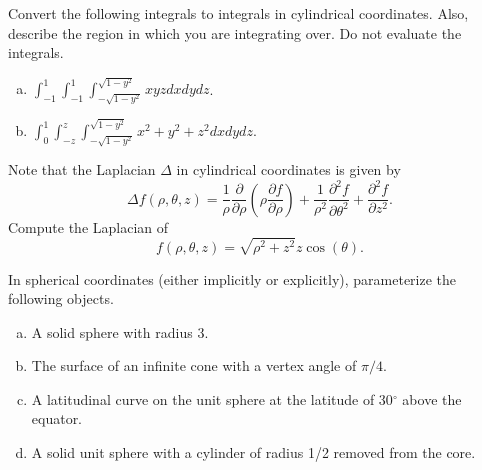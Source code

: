 \documentclass[12pt]{article} %
\begin{document}
\vspace*{.5cm}

\begin{problem}
    Convert the following integrals to integrals in cylindrical coordinates. Also, describe the region in which you are integrating over. Do not evaluate the integrals.
    \begin{enumerate}[(a)]
        \item $\displaystyle{\int_{-1}^{1} \int_{-1}^{1} \int_{-\sqrt{1-y^2}}^{\sqrt{1-y^2}} xyz dxdydz}$.
        \item $\displaystyle{\int_0^1 \int_{-z}^z \int_{-\sqrt{1-y^2}}^{\sqrt{1-y^2}} x^2+y^2+z^2 dxdydz}$.
    \end{enumerate}
\end{problem}

\vspace*{.5cm}

\begin{problem}
    Note that the Laplacian $\Delta$ in cylindrical coordinates is given by
    \[
        \Delta f(\rho,\theta,z) = \frac{1}{\rho} \frac{\partial}{\partial \rho} \left(\rho \frac{\partial f}{\partial \rho}\right)+\frac{1}{\rho^2}\frac{\partial^2 f}{\partial \theta^2} + \frac{\partial^2 f}{\partial z^2}.
    \]
    Compute the Laplacian of
    \[
        f(\rho,\theta,z) = \sqrt{\rho^2+z^2} z \cos(\theta).
    \]
\end{problem}

\begin{problem}
	In spherical coordinates (either implicitly or explicitly), parameterize the following objects.
	\begin{enumerate}[(a)]
		\item A solid sphere with radius 3.
		\item The surface of an infinite cone with a vertex angle of $\pi/4$.
		\item A latitudinal curve on the unit sphere at the latitude of 30$^\circ$ above the equator.
		\item A solid unit sphere with a cylinder of radius 1/2 removed from the core.
	\end{enumerate}
\end{problem}

\vspace*{.5cm}
\end{document}
